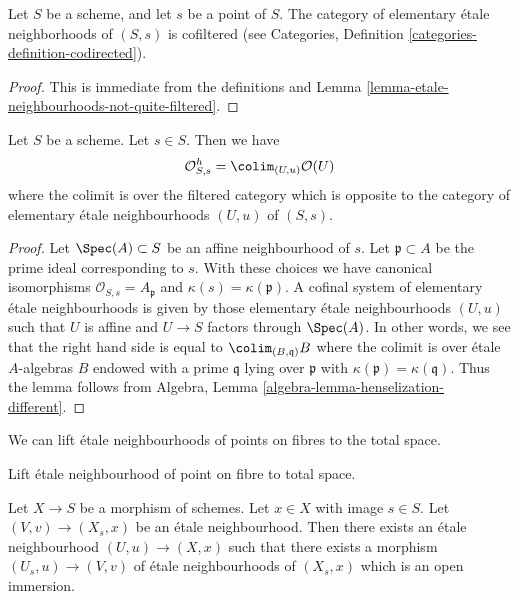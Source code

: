 \begin{lemma}
\label{lemma-elementary-etale-neighbourhoods}
Let $S$ be a scheme, and let $s$ be a point of $S$.
The category of elementary \'etale neighborhoods of $(S, s)$
is cofiltered (see
Categories, Definition \ref{categories-definition-codirected}).
\end{lemma}

\begin{proof}
This is immediate from the definitions and
Lemma \ref{lemma-etale-neighbourhoods-not-quite-filtered}.
\end{proof}

\begin{lemma}
\label{lemma-describe-henselization}
Let $S$ be a scheme. Let $s \in S$. Then we have
$$
\mathcal{O}_{S, s}^h =
\colim_{(U, u)} \mathcal{O}(U)
$$
where the colimit is over the filtered category which is opposite to the
category of elementary \'etale neighbourhoods $(U, u)$ of $(S, s)$.
\end{lemma}

\begin{proof}
Let $\Spec(A) \subset S$ be an affine neighbourhood of $s$.
Let $\mathfrak p \subset A$ be the prime ideal corresponding to $s$.
With these choices we have canonical isomorphisms
$\mathcal{O}_{S, s} = A_{\mathfrak p}$ and $\kappa(s) = \kappa(\mathfrak p)$.
A cofinal system of elementary \'etale neighbourhoods is given by those
elementary \'etale neighbourhoods $(U, u)$ such that $U$ is affine and
$U \to S$ factors through $\Spec(A)$. In other words, we see that
the right hand side is equal to $\colim_{(B, \mathfrak q)} B$
where the colimit is over \'etale $A$-algebras $B$ endowed with a prime
$\mathfrak q$ lying over $\mathfrak p$ with
$\kappa(\mathfrak p) = \kappa(\mathfrak q)$.
Thus the lemma follows from
Algebra, Lemma \ref{algebra-lemma-henselization-different}.
\end{proof}

\noindent
We can lift \'etale neighbourhoods of points on fibres
to the total space.

\begin{lemma}
\label{lemma-lift-etale-neighbourhood-fibre}
\begin{slogan}
Lift \'etale neighbourhood of point on fibre to total space.
\end{slogan}
Let $X \to S$ be a morphism of schemes. Let $x \in X$ with image $s \in S$.
Let $(V, v) \to (X_s, x)$ be an \'etale neighbourhood.
Then there exists an \'etale neighbourhood $(U, u) \to (X, x)$
such that there exists a morphism $(U_s, u) \to (V, v)$
of \'etale neighbourhoods of $(X_s, x)$ which is an open immersion.
\end{lemma}

